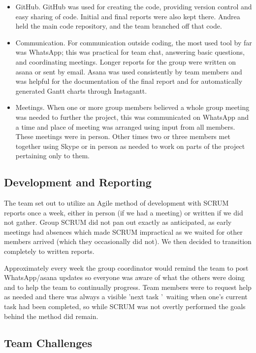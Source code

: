 \documentclass[11pt]{article}
\begin{document}
\begin{enumerate}
\begin{itemize}\itemsep0pt
\item GitHub. GitHub was used for creating the code, providing version control and easy sharing of code. Initial and final reports were also kept there. Andrea held the main code repository, and the team branched off that code.
\item Communication. For communication outside coding, the most used tool by far was WhatsApp; this was practical for team chat, answering basic questions, and coordinating meetings. Longer reports for the group were written on asana or sent by email. Asana was used consistently by team members and was helpful for the documentation of the final report and for automatically generated Gantt charts through Instagantt.
\item Meetings. When one or more group members believed a whole group meeting was needed to further the project, this was communicated on WhatsApp and a time and place of meeting was arranged using input from all members. These meetings were in person. Other times two or three members met together using Skype or in person as needed to work on parts of the project pertaining only to them.
\end{itemize}



\subsection{Development and Reporting}

The team set out to utilize an Agile method of development with SCRUM reports once a week, either in person (if we had a meeting) or written if we did not gather. Group SCRUM did not pan out exactly as anticipated, as early meetings had absences which made SCRUM impractical as we waited for other members arrived (which they occasionally did not). We then decided to transition completely to written reports. 

Approximately every week the group coordinator would remind the team to post WhatsApp/asana updates so everyone was aware of what the others were doing and to help the team to continually progress. Team members were to request help as needed and there was always a visible \textquoteright next task \textquoteright\ waiting when one\textquoteright s current task had been completed, so while SCRUM was not overtly performed the goals behind the method did remain.


\subsection{Team Challenges}


\end{enumerate}
\end{document}
